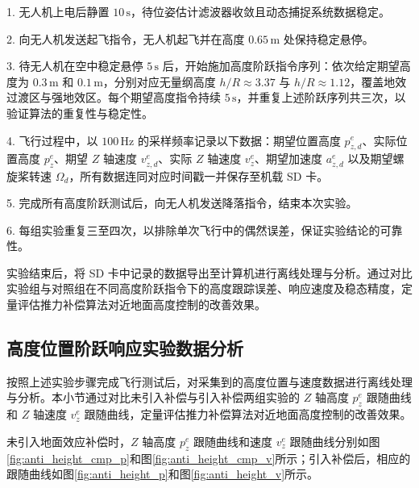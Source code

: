 1. 无人机上电后静置 \(10\,\mathrm{s}\)，待位姿估计滤波器收敛且动态捕捉系统数据稳定。

2. 向无人机发送起飞指令，无人机起飞并在高度 \(0.65\,\mathrm{m}\) 处保持稳定悬停。

3. 待无人机在空中稳定悬停 \(5\,\mathrm{s}\) 后，开始施加高度阶跃指令序列：依次给定期望高度为 \(0.3\,\mathrm{m}\) 和 \(0.1\,\mathrm{m}\)，分别对应无量纲高度 \(h/R \approx 3.37\) 与 \(h/R \approx 1.12\)，覆盖地效过渡区与强地效区。每个期望高度指令持续 \(5\,\mathrm{s}\)，并重复上述阶跃序列共三次，以验证算法的重复性与稳定性。

4. 飞行过程中，以 \(100\,\mathrm{Hz}\) 的采样频率记录以下数据：期望位置高度 \(p_{z,d}^e\)、实际位置高度 \(p_z^e\)、期望 \(Z\) 轴速度 \(v_{z,d}^e\)、实际 \(Z\) 轴速度 \(v_z^e\)、期望加速度 \(a_{z,d}^e\) 以及期望螺旋桨转速 \(\Omega_d\)，所有数据连同对应时间戳一并保存至机载 SD 卡。

5. 完成所有高度阶跃测试后，向无人机发送降落指令，结束本次实验。

6. 每组实验重复三至四次，以排除单次飞行中的偶然误差，保证实验结论的可靠性。

实验结束后，将 SD 卡中记录的数据导出至计算机进行离线处理与分析。通过对比实验组与对照组在不同高度阶跃指令下的高度跟踪误差、响应速度及稳态精度，定量评估推力补偿算法对近地面高度控制的改善效果。

\subsection{高度位置阶跃响应实验数据分析}

按照上述实验步骤完成飞行测试后，对采集到的高度位置与速度数据进行离线处理与分析。本小节通过对比未引入补偿与引入补偿两组实验的 $Z$ 轴高度 $p_z^e$ 跟随曲线和 $Z$ 轴速度 $v_z^e$ 跟随曲线，定量评估推力补偿算法对近地面高度控制的改善效果。

未引入地面效应补偿时，$Z$ 轴高度 $p_z^e$ 跟随曲线和速度 $v_z^e$ 跟随曲线分别如图\ref{fig:anti_height_cmp_p}和图\ref{fig:anti_height_cmp_v}所示；引入补偿后，相应的跟随曲线如图\ref{fig:anti_height_p}和图\ref{fig:anti_height_v}所示。

